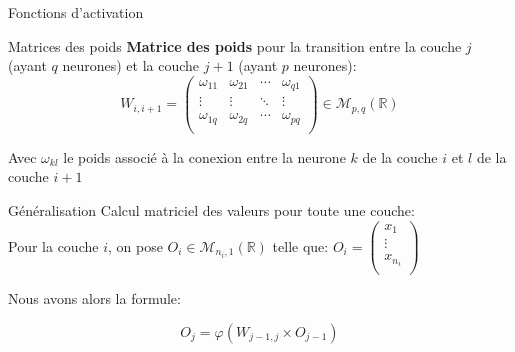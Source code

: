 \documentclass[10pt]{beamer}
\begin{document}
\begin{frame}{Fonctions d'activation}
  \begin{figure}
  \end{figure}
\end{frame}

\begin{frame}{Matrices des poids}
	\textbf{Matrice des poids} pour la transition entre la couche $j$ (ayant $q$ neurones) et la couche $j+1$ (ayant $p$ neurones):
	\[W_{i,i+1} = \begin{pmatrix}
		\omega_{11} & \omega_{21} & \cdots & \omega_{q1}\\
		\vdots & \vdots & \ddots & \vdots\\
		\omega_{1q} & \omega_{2q} & \cdots & \omega_{pq}\\
	\end{pmatrix} \in \mathscr{M}_{p,q}(\mathbb{R})\]

	Avec $\omega_{kl}$ le poids associ\'e \`a la conexion entre la neurone $k$ de la couche $i$ et $l$ de la couche $i+1$\\
\end{frame}

\begin{frame}{G\'en\'eralisation}
	Calcul matriciel des valeurs pour toute une couche:\\
	Pour la couche $i$, on pose $O_i \in \mathscr{M}_{n_i,1}(\mathbb{R})$ telle que:
	$O_i = \begin{pmatrix}
		x_1 \\
		\vdots \\
		x_{n_i}\\
	\end{pmatrix}$

	Nous avons alors la formule:

	\[O_j=\varphi(W_{j-1,j}\times O_{j-1})\]

\end{frame}
\end{document}
